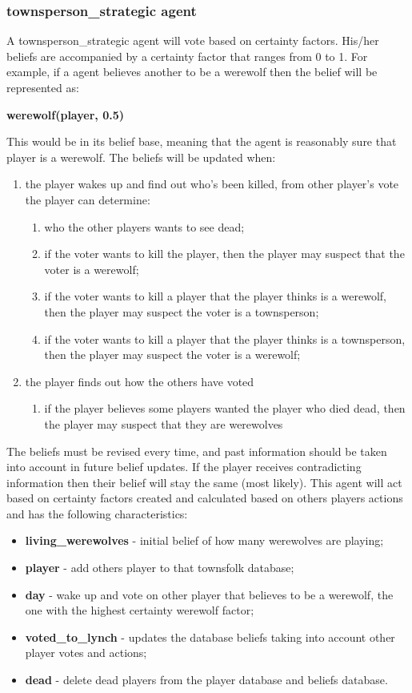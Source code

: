 \documentclass{article}
\begin{document}
\subsubsection{townsperson\_strategic agent}
A townsperson\_strategic agent will vote based on certainty factors. 
His/her beliefs are accompanied by a certainty factor that ranges from 0 to 1. For example, if a agent believes another to be a werewolf then the belief will be represented as: 
\newline
\centerline{\textbf{werewolf(player, 0.5)}} 
\newline
\newline
This would be in its belief base, meaning that the agent is reasonably sure that player is a werewolf. The beliefs will be updated when:
\begin{enumerate}
	\item the player wakes up and find out who's been killed, from other player's vote the player can determine:
	\begin {enumerate}
		\item who the other players wants to see dead;
		\item if the voter wants to kill the player, then the player may suspect that the voter is a werewolf;
		\item if the voter wants to kill a player that the player thinks is a werewolf, then the player may suspect the voter is a townsperson;
		\item if the voter wants to kill a player that the player thinks is a townsperson, then the player may suspect the voter is a werewolf;
	\end{enumerate}
	\item the player finds out how the others have voted
	\begin{enumerate}
		\item if the player believes some players wanted the player who died dead, then the player may suspect that they are werewolves
	\end{enumerate}
\end{enumerate}
The beliefs must be revised every time, and past information should be taken into account in future belief updates. If the player receives contradicting information then their belief will stay the same (most likely).
This agent will act based on certainty factors created and calculated based on others players actions and has the following characteristics:
\begin{itemize}
	\item \textbf{living\_werewolves} - initial belief of how many werewolves are playing; 
	\item \textbf{player} - add others player to that townsfolk database;
	\item \textbf{day} - wake up and vote on other player that believes to be a werewolf, the one with the highest certainty werewolf factor;
	\item \textbf{voted\_to\_lynch} - updates the database beliefs taking into account other player votes and actions;
	\item \textbf{dead} - delete dead players from the player database and beliefs database.
\end{itemize}
\end{document}
